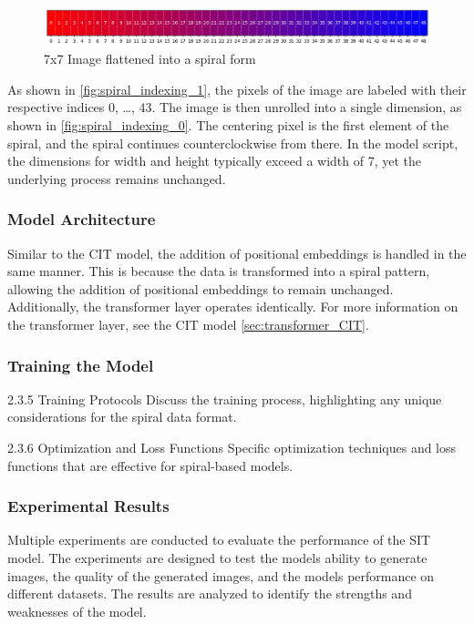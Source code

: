     \begin{figure}[H]
    \centering
    \includegraphics[width=1\textwidth]{../code/dataAnalysis/plots/exampleImgs/spiralShowcase0.png}
    \caption{7x7 Image flattened into a spiral form} 
    \label{fig:spiral_indexing_0}        
    \end{figure}

    As shown in \autoref{fig:spiral_indexing_1}, the pixels of the image are labeled with their respective indices 0, \dots, 43. The image is then unrolled into a single dimension, as shown in \autoref{fig:spiral_indexing_0}. The centering pixel is the first element of the spiral, and the spiral continues counterclockwise from there. In the model script, the dimensions for width and height typically exceed a width of 7, yet the underlying process remains unchanged.



\subsubsection{Model Architecture}

Similar to the CIT model, the addition of positional embeddings is handled in the same manner. This is because the data is transformed into a spiral pattern, allowing the addition of positional embeddings to remain unchanged. Additionally, the transformer layer operates identically. For more information on the transformer layer, see the CIT model \autoref{sec:transformer_CIT}.


\subsubsection{Training the Model}
2.3.5 Training Protocols
Discuss the training process, highlighting any unique considerations for the spiral data format.

2.3.6 Optimization and Loss Functions
Specific optimization techniques and loss functions that are effective for spiral-based models.

\subsubsection{Experimental Results}
Multiple experiments are conducted to evaluate the performance of the SIT model. The experiments are designed to test the models ability to generate images, the quality of the generated images, and the models performance on different datasets. The results are analyzed to identify the strengths and weaknesses of the model.

